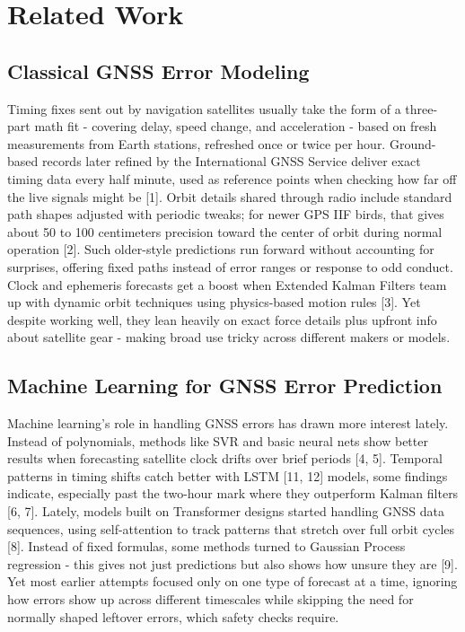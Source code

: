 \documentclass[conference]{IEEEtran}
\begin{document}
\section{Related Work}

\subsection{Classical GNSS Error Modeling}

Timing fixes sent out by navigation satellites usually take the form of a three-part math fit - covering delay, speed change, and acceleration - based on fresh measurements from Earth stations, refreshed once or twice per hour. Ground-based records later refined by the International GNSS Service deliver exact timing data every half minute, used as reference points when checking how far off the live signals might be [1]. Orbit details shared through radio include standard path shapes adjusted with periodic tweaks; for newer GPS IIF birds, that gives about 50 to 100 centimeters precision toward the center of orbit during normal operation [2]. Such older-style predictions run forward without accounting for surprises, offering fixed paths instead of error ranges or response to odd conduct.
Clock and ephemeris forecasts get a boost when Extended Kalman Filters team up with dynamic orbit techniques using physics-based motion rules [3]. Yet despite working well, they lean heavily on exact force details plus upfront info about satellite gear - making broad use tricky across different makers or models.

\subsection{Machine Learning for GNSS Error Prediction}

Machine learning's role in handling GNSS errors has drawn more interest lately. Instead of polynomials, methods like SVR and basic neural nets show better results when forecasting satellite clock drifts over brief periods [4, 5]. Temporal patterns in timing shifts catch better with LSTM [11, 12] models, some findings indicate, especially past the two-hour mark where they outperform Kalman filters [6, 7].
Lately, models built on Transformer designs started handling GNSS data sequences, using self-attention to track patterns that stretch over full orbit cycles [8]. Instead of fixed formulas, some methods turned to Gaussian Process regression - this gives not just predictions but also shows how unsure they are [9]. Yet most earlier attempts focused only on one type of forecast at a time, ignoring how errors show up across different timescales while skipping the need for normally shaped leftover errors, which safety checks require.
\end{document}
